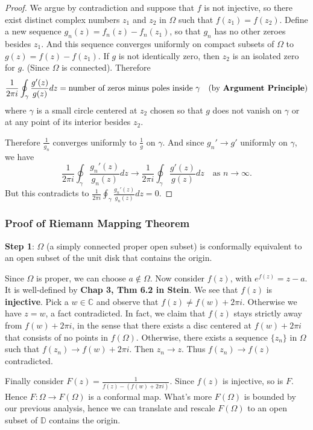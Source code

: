 \documentclass{article}
\begin{document}
\begin{proof}
We argue by contradiction and suppose that $f$ is not injective, so there exist distinct complex numbers $z_1$ and $z_2$ in $\Omega$ such that $f(z_1) = f(z_2)$. Define a new sequence $g_n(z) = f_n(z) - f_n(z_1)$, so that $g_n$ has no other zeroes besides $z_1$.
And this sequence converges uniformly on compact subsets of $\Omega$ to $g(z) = f(z) - f(z_1)$.
If $g$ is not identically zero, then $z_2$ is an isolated zero for $g$.
(Since $\Omega$ is connected). Therefore
$$\frac{1}{2\pi i} \oint_\gamma \frac{g'(z)}{g(z)} dz =\text{number of zeros minus poles inside } \gamma \quad \text{(by \textbf{Argument Principle})}$$
where $\gamma$ is a small circle centered at $z_2$ chosen so that $g$ does not vanish on $\gamma$ or at any point of its interior besides $z_2$.

Therefore $\frac{1}{g_n}$ converges uniformly to $\frac{1}{g}$ on $\gamma$. And since $g_n' \to g'$ uniformly on $\gamma$, we have
$$\frac{1}{2\pi i} \oint_\gamma \frac{g_n'(z)}{g_n(z)} dz \to \frac{1}{2\pi i} \oint_\gamma \frac{g'(z)}{g(z)} dz \quad \text{as } n \to \infty.$$
But this contradicts to $\frac{1}{2\pi i} \oint_\gamma \frac{g_n'(z)}{g_n(z)} dz = 0$.
\end{proof}

\subsubsection*{Proof of Riemann Mapping Theorem}

\textbf{Step 1}: $\Omega$ (a simply connected proper open subset) is conformally equivalent to an open subset of the unit disk that contains the origin.

Since $\Omega$ is proper, we can choose $a \notin \Omega$.
Now consider $f(z)$, with $e^{f(z)} = z - a$.
It is well-defined by \textbf{Chap 3, Thm 6.2 in Stein}.
We see that $f(z)$ is \textbf{injective}. Pick a $w \in \mathbb{C}$ and observe that $f(z) \ne f(w) + 2\pi i$. Otherwise we have $z = w$, a fact contradicted.
In fact, we claim that $f(z)$ stays strictly away from $f(w) + 2\pi i$, in the sense that there exists a disc centered at $f(w) + 2\pi i$ that consists of no points in $f(\Omega)$. Otherwise, there exists a sequence $\{z_n\}$ in $\Omega$ such that $f(z_n) \to f(w) + 2\pi i$. Then $z_n \to z$.
Thus $f(z_n) \to f(z)$ contradicted.

Finally consider $F(z) = \frac{1}{f(z) - (f(w) + 2\pi i)}$.
Since $f(z)$ is injective, so is $F$. Hence $F: \Omega \to F(\Omega)$ is a conformal map. What's more $F(\Omega)$ is bounded by our previous analysis, hence we can translate and rescale $F(\Omega)$ to an open subset of $\mathbb{D}$ contains the origin.
\end{document}
